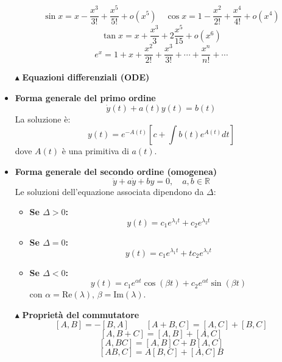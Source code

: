 \documentclass{book}
\newcommand{\g}{\textbf}
\newcommand{\e}{\begin{equation}}
\newcommand{\ex}{\end{equation} }
\renewcommand{\it}{\item[$\cdot$]}
\begin{document}
\begin{multicols}{4}
\begin{itemize}
        \e{\sin x = x - \frac{x^3}{3!} + \frac{x^5}{5!} + o(x^5) \quad \cos x = 1 - \frac{x^2}{2!} + \frac{x^4}{4!} + o(x^4)} \ex
        \e{\tan x = x + \frac{x^3}{3} + 2\frac{x^5}{15} + o(x^6)} \ex
        \e{e^x = 1 + x + \frac{x^2}{2!} + \frac{x^3}{3!} + \cdots + \frac{x^n}{n!} + \cdots}\ex
\item [$\blacktriangle$] \g{Equazioni differenziali (ODE)}
    \it \g{Forma generale del primo ordine}
        \e{\dot{y}(t) + a(t)y(t) = b(t)} \ex
        La soluzione è:
        \e{y(t) = e^{-A(t)}\left[c + \int b(t)e^{A(t)}dt\right]} \ex
        dove $A(t)$ è una primitiva di $a(t)$.

    \it \g{Forma generale del secondo ordine (omogenea)}
        \e{\ddot{y} + a\dot{y} + by = 0, \quad a, b \in \mathbb{R}} \ex
        Le soluzioni dell'equazione associata dipendono da $\Delta$:
        \begin{itemize}
            \it \g{Se $\Delta > 0$:}
                \e{y(t) = c_1 e^{\lambda_1 t} + c_2 e^{\lambda_2 t}} \ex
            \it \g{Se $\Delta = 0$:}
                \e{y(t) = c_1 e^{\lambda_1 t} + t c_2 e^{\lambda_1 t}} \ex
            \it \g{Se $\Delta < 0$:}
                \e{y(t) = c_1 e^{\alpha t}\cos(\beta t) + c_2 e^{\alpha t}\sin(\beta t)} \ex
                con $\alpha = \text{Re}(\lambda), \, \beta = \text{Im}(\lambda)$.
        \end{itemize}
\item [$\blacktriangle$] \g{Proprietà del commutatore}
    \e{[A, B] = -[B, A] \qquad [A + B, C] = [A, C] + [B, C]} \ex
    \e{[A, B + C] = [A, B] + [A, C]}\ex
    \e{[A, BC] = [A, B]C + B[A, C] }\ex 
    \e{[AB, C] = A[B, C] + [A, C]B} \ex


\end{itemize}

\end{multicols}
\end{document}
